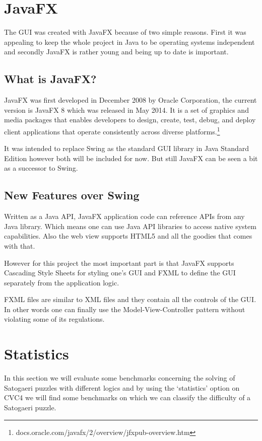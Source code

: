 \chapter{JavaFX} \label{JavaFX}
The GUI was created with JavaFX because of two simple reasons. First it was appealing to keep the whole project in Java to be operating systems independent and secondly JavaFX is rather young and being up to date is important.

\section{What is JavaFX?}
JavaFX was first developed in December 2008 by Oracle Corporation, the current version is JavaFX 8 which was released in May 2014. It is a set of graphics and media packages that enables developers to design, create, test, debug, and deploy client applications that operate consistently across diverse platforms.\footnote{docs.oracle.com/javafx/2/overview/jfxpub-overview.htm} 

It was intended to replace Swing as the standard GUI library in Java Standard Edition however both will be included for now. But still JavaFX can be seen a bit as a successor to Swing.

\section{New Features over Swing}
Written as a Java API, JavaFX application code can reference APIs from any Java library. Which means one can use Java API libraries to access native system capabilities. 
Also the web view supports HTML5 and all the goodies that comes with that.

However for this project the most important part is that JavaFX supports Cascading Style Sheets for styling one's GUI and FXML to define the GUI separately from the application logic.

FXML files are similar to XML files and they contain all the controls of the GUI. In other words one can finally use the Model-View-Controller pattern without violating some of its regulations.

\chapter{Statistics} \label{Statistics}
In this section we will evaluate some benchmarks concerning the solving of Satogaeri puzzles with different logics and by using the `statistics' option on CVC4 we will find some benchmarks on which we can classify the difficulty of a Satogaeri puzzle.

